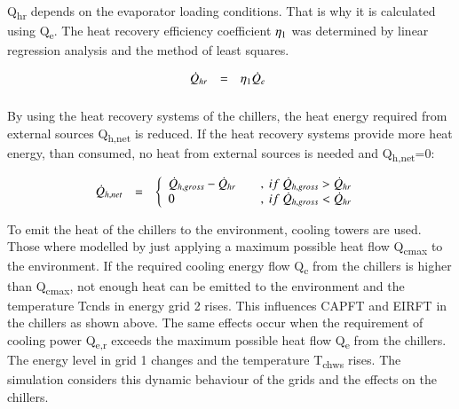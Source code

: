 \documentclass[3p,times,procedia,twocolumn,twoside]{elsarticle}
\begin{document}
Q\textsubscript{hr} depends on the evaporator loading conditions. That is why it is calculated using Q\textsubscript{e}. The heat recovery efficiency coefficient  $ \eta\textsubscript{1} $ was determined by linear regression analysis and the method of least squares.

\begin{equation}
\begin{array}{@{}lcl}
\displaystyle 

\dot{Q}_{hr} &=& \eta_{1}\dot{Q}_{e} 

\\[6pt]
\end{array}\vspace*{-12pt}
\end{equation}

By using the heat recovery systems of the chillers, the heat energy required from external sources Q\textsubscript{h,net} is reduced. If the heat recovery systems provide more heat energy, than consumed, no heat from external sources is needed and Q\textsubscript{h,net}=0:

\begin{equation}
\begin{array}{@{}lcl}
\displaystyle 

\dot{Q}_{h,net} &=&  
\left\{ \begin{array}{lcl}
\dot{Q}_{h,gross} - \dot{Q}_{hr} & &,\ if\ \dot{Q}_{h,gross} > \dot{Q}_{hr} \\ 
0 & &,\ if\ \dot{Q}_{h,gross} < \dot{Q}_{hr}
\end{array}\right.

\\[6pt]
\end{array}\vspace*{-12pt}
\end{equation}

To emit the heat of the chillers to the environment, cooling towers are used. Those where modelled by just applying a maximum possible heat flow Q\textsubscript{cmax} to the environment. If the required cooling energy flow Q\textsubscript{c} from the chillers is higher than Q\textsubscript{cmax}, not enough heat can be emitted to the environment and the temperature Tcnds in energy grid 2 rises. This influences CAPFT and EIRFT in the chillers as shown above.
The same effects occur when the requirement of cooling power Q\textsubscript{e,r} exceeds the maximum possible heat flow Q\textsubscript{e} from the chillers. The energy level in grid 1 changes and the temperature T\textsubscript{chws} rises. The simulation considers this dynamic behaviour of the grids and the effects on the chillers.
\end{document}
